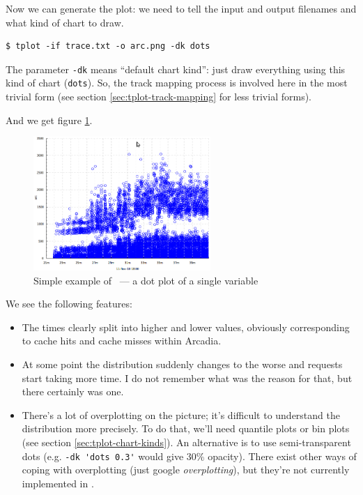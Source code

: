 \documentclass{article}
\begin{document}
Now we can generate the plot: we need to tell \timeplot{} the input and output filenames and what kind of chart to draw.
\begin{verbatim}
$ tplot -if trace.txt -o arc.png -dk dots
\end{verbatim}

The parameter \verb|-dk| means ``default chart kind'': just draw everything using this kind of chart (\verb|dots|). So, the track mapping process is involved here in the most trivial form (see section \ref{sec:tplot-track-mapping} for less trivial forms).

And we get figure \ref{fig:tplot-simple-example}.

\begin{figure}[h!]
\center
\includegraphics[width=0.6\textwidth]{pics/tplot/dots.png}
\caption{Simple example of \timeplot{}~--- a dot plot of a single variable}
\label{fig:tplot-simple-example}
\end{figure}

We see the following features:
\begin{itemize}
\item The times clearly split into higher and lower values, obviously corresponding to cache hits and cache misses within Arcadia.
\item At some point the distribution suddenly changes to the worse and requests start taking more time. I do not remember what was the reason for that, but there certainly was one.
\item There's a lot of overplotting on the picture; it's difficult to understand the distribution more precisely. To do that, we'll need quantile plots or bin plots (see section \ref{sec:tplot-chart-kinds}). An alternative is to use semi-transparent dots (e.g. \verb|-dk 'dots 0.3'| would give 30\% opacity). There exist other ways of coping with overplotting (just google \emph{overplotting}), but they're not currently implemented in \timeplot{}.
\end{itemize}
\end{document}
